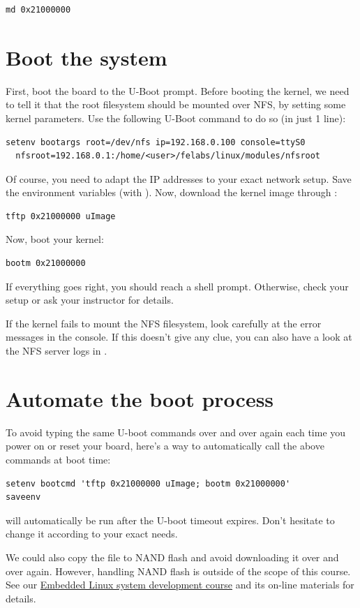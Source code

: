 \begin{verbatim}
md 0x21000000
\end{verbatim}

\section{Boot the system}

First, boot the board to the U-Boot prompt.  Before booting the
kernel, we need to tell it that the root filesystem should be mounted
over NFS, by setting some kernel parameters.  Use the following U-Boot
command to do so (in just 1 line):

\begin{verbatim}
setenv bootargs root=/dev/nfs ip=192.168.0.100 console=ttyS0
  nfsroot=192.168.0.1:/home/<user>/felabs/linux/modules/nfsroot
\end{verbatim}

Of course, you need to adapt the IP addresses to your exact network
setup. Save the environment variables (with ).  Now, download
the kernel image through :

\begin{verbatim}
tftp 0x21000000 uImage
\end{verbatim}

Now, boot your kernel:

\begin{verbatim}
bootm 0x21000000
\end{verbatim}

If everything goes right, you should reach a shell prompt. Otherwise,
check your setup or ask your instructor for details.

If the kernel fails to mount the NFS filesystem, look carefully at the
error messages in the console. If this doesn't give any clue, you can
also have a look at the NFS server logs in .

\section{Automate the boot process}

To avoid typing the same U-boot commands over and over again each time
you power on or reset your board, here's a way to automatically call the
above commands at boot time:

\begin{verbatim}
setenv bootcmd 'tftp 0x21000000 uImage; bootm 0x21000000'
saveenv
\end{verbatim}

 will automatically be run after the U-boot timeout
expires. Don't hesitate to change it according to your exact needs.

We could also copy the  file to NAND flash and avoid
downloading it over and over again. However, handling NAND flash is
outside of the scope of this course. See our
\href{http://free-electrons.com/training/embedded-linux/}{Embedded
Linux system development course} and its on-line materials for details.
